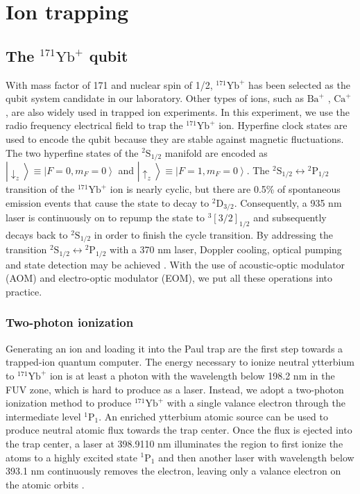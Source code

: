 
\chapter{Ion trapping}
\label{chap:ion_trapping}

\section{The \texorpdfstring{${ }^{171} \mathrm{Yb}^{+}$}{} qubit}

With mass factor of 171 and nuclear spin of 1/2, ${ }^{171} \mathrm{Yb}^{+}$ has been selected as the qubit system candidate in our laboratory. Other types of ions, such as $\mathrm{Ba}^+$ \cite{RN259,RN156,RN253}, $\mathrm{Ca}^+$ \cite{RN164}, are also widely used in trapped ion experiments. In this experiment, we use the radio frequency electrical field to trap the ${ }^{171} \mathrm{Yb}^{+}$ ion. Hyperfine clock states are used to encode the qubit because they are stable against magnetic fluctuations. The two hyperfine states of the ${ }^2 \mathrm{S}_{1 / 2}$ manifold are encoded as $\left|\downarrow_z\right\rangle \equiv\left|F=0, m_F=0\right\rangle$ and $\left|\uparrow_z\right\rangle \equiv\left|F=1, m_F=0\right\rangle$. The ${ }^2 \mathrm{S}_{1 / 2} \leftrightarrow{ }^2 \mathrm{P}_{1 / 2}$ transition of the ${ }^{171} \mathrm{Yb}^{+}$ ion is nearly cyclic, but there are 0.5\% of spontaneous emission events that cause the state to decay to ${ }^2 \mathrm{D}_{3 / 2}$. Consequently, a 935 nm laser is continuously on to repump the state to ${ }^{3} [3 / 2]_{1 / 2}$ and subsequently decays back to ${ }^2 \mathrm{S}_{1 / 2}$ in order to finish the cycle transition. By addressing the transition ${ }^2 \mathrm{S}_{1 / 2} \leftrightarrow{ }^2 \mathrm{P}_{1 / 2}$ with a 370 nm laser, Doppler cooling, optical pumping and state detection may be achieved \cite{RN281}. With the use of acoustic-optic modulator (AOM) and electro-optic modulator (EOM), we put all these operations into practice.

\subsection{Two-photon ionization}

Generating an ion and loading it into the Paul trap are the first step towards a trapped-ion quantum computer. The energy necessary to ionize neutral ytterbium to ${ }^{171} \mathrm{Yb}^{+}$ ion is at least a photon with the wavelength below 198.2 nm in the FUV zone, which is hard to produce as a laser. Instead, we adopt a two-photon ionization method to produce ${ }^{171} \mathrm{Yb}^{+}$ with a single valance electron through the intermediate level ${ }^1 \mathrm{P}_1$. An enriched ytterbium atomic source can be used to produce neutral atomic flux towards the trap center. Once the flux is ejected into the trap center, a laser at 398.9110 nm illuminates the region to first ionize the atoms to a highly excited state ${ }^1 \mathrm{P}_1$ and then another laser with wavelength below 393.1 nm continuously removes the electron, leaving only a valance electron on the atomic orbits \cite{RN74,RN132,RN85}.

